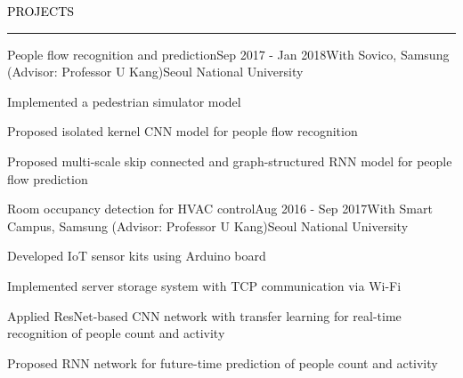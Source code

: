\documentclass{resume} %
\renewenvironment{rSection}[1]{
	\sectionskip
	\textcolor{Black}{\MakeUppercase{#1}}
	\sectionlineskip
	\hrule
	\begin{list}{}{
			\setlength{\leftmargin}{1.5em}
		}
		\item[]
	}{
	\end{list}
}
\begin{document}

\begin{rSection}{Projects}
	\begin{rSubsection}{People flow recognition and prediction}{Sep 2017 - Jan 2018}{With Sovico, Samsung (Advisor: Professor U Kang)}{Seoul National University}
		\item Implemented a pedestrian simulator model
		\item Proposed isolated kernel CNN model for people flow recognition
		\item Proposed multi-scale skip connected and graph-structured RNN model for people flow prediction
	\end{rSubsection}	
	\begin{rSubsection}{Room occupancy detection for HVAC control}{Aug 2016 - Sep 2017}{With Smart Campus, Samsung (Advisor: Professor U Kang)}{Seoul National University}
		\item Developed IoT sensor kits using Arduino board
		\item Implemented server storage system with TCP communication via Wi-Fi
		\item Applied ResNet-based CNN network with transfer learning for real-time recognition of people count and activity
		\item Proposed RNN network for future-time prediction of people count and activity
	\end{rSubsection}	
	
\end{rSection}

	
\end{document}
